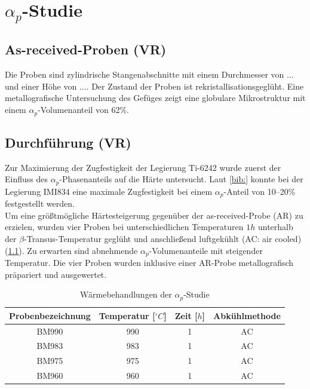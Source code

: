 \chapter{$\alpha_p$-Studie}

\section{As-received-Proben (VR)}
Die Proben sind zylindrische Stangenabschnitte mit einem Durchmesser von {...} und einer Höhe von {...}. Der Zustand der Proben ist rekristallisationsgeglüht. Eine metallografische Untersuchung des Gefüges zeigt eine globulare Mikrostruktur mit einem $\alpha_p$-Volumenanteil von 62\%. 

\section{Durchführung (VR)}

Zur Maximierung der Zugfestigkeit der Legierung Ti-6242 wurde zuerst der Einfluss des $\alpha_p$-Phasenanteils auf die Härte untersucht. Laut \ref{bib:} konnte bei der Legierung IMI834 eine maximale Zugfestigkeit bei einem $\alpha_p$-Anteil von 10--20\% festgestellt werden. \\
Um eine größtmögliche Härtesteigerung gegenüber der as-received-Probe (AR) zu erzielen, wurden vier Proben bei unterschiedlichen Temperaturen $1h$ unterhalb der $\beta$-Transus-Temperatur geglüht und anschließend luftgekühlt (AC: air cooled) (\ref{tab:alphap}). Zu erwarten sind abnehmende $\alpha_p$-Volumenanteile mit steigender Temperatur. Die vier Proben wurden inklusive einer AR-Probe metallografisch präpariert und ausgewertet.



\begin{table}
	\centering
	\begin{tabular}{|c|c|c|c|}
		\hline 
		Probenbezeichnung & Temperatur [$^\circ C$] & Zeit [$h$] & Abkühlmethode \\ 
		\hline 
		BM990 & 990 & 1 & AC\\ 
		\hline 
		BM983 & 983 & 1 & AC\\
		\hline
		BM975 & 975 & 1 & AC\\ 
		\hline
		BM960 & 960 & 1 & AC\\ 
		\hline 
	\end{tabular} 
	\caption{Wärmebehandlungen der $\alpha_p$-Studie}
	\label{tab:alphap}
\end{table}





